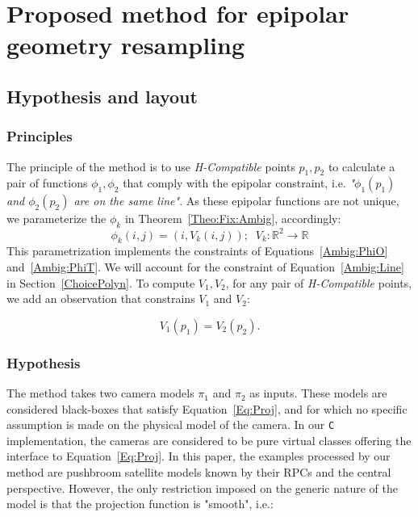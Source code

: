\documentclass{ipol}
\newcommand{\CPP}{\mbox{\tt C\hspace{-0.05cm}\raisebox{0.2ex}{\small ++} }}
\newcommand{\RR}{\ensuremath{\mathbb{R}}}
\begin{document}

\section{Proposed method for epipolar geometry resampling}\label{sec:method}


\subsection{Hypothesis and layout}

\subsubsection{Principles}
The principle of the method is to use \emph{H-Compatible}  points $p_1,p_2$ to calculate a
pair of functions $\phi_1,\phi_2$ that comply with the epipolar constraint, i.e. 
\emph{"$\phi_1(p_1)$ and $\phi_2(p_2)$ are on the same line"}. As these epipolar functions
are not unique, we parameterize the $\phi_k$ in Theorem~\ref{Theo:Fix:Ambig}, accordingly:
%
\begin{equation}
    \phi_k(i,j) = (i,V_k(i,j)); \; \;
    V_k : \RR^2 \rightarrow \RR  
  \label{EpipVParam}
\end{equation}
%
This parametrization implements the constraints of Equations~\eqref{Ambig:PhiO} and~\eqref{Ambig:PhiT}. We will account for the constraint of  Equation~\eqref{Ambig:Line} in Section~\ref{ChoicePolyn}. %
To compute $V_1,V_2$, for any pair of \emph{H-Compatible} points, we add an observation that constrains $V_1$ and $V_2$:


\begin{equation}
    V_1(p_1) = V_2(p_2) \label{EqV1V2}.
\end{equation}

\subsubsection{Hypothesis}


The method takes two camera models $\pi_1$ and $\pi_2$ as inputs.
These models are considered black-boxes that satisfy Equation~\eqref{Eq:Proj}, and for which no specific assumption is made on the physical model of the camera. In our \CPP implementation,
the cameras are considered to be pure virtual classes offering the interface to Equation~\eqref{Eq:Proj}.
In this paper, the examples processed by our method are pushbroom satellite models known by their RPCs and the central perspective. However, the only restriction imposed on the generic nature of the model is that the projection function is "smooth", i.e.:
\end{document}
